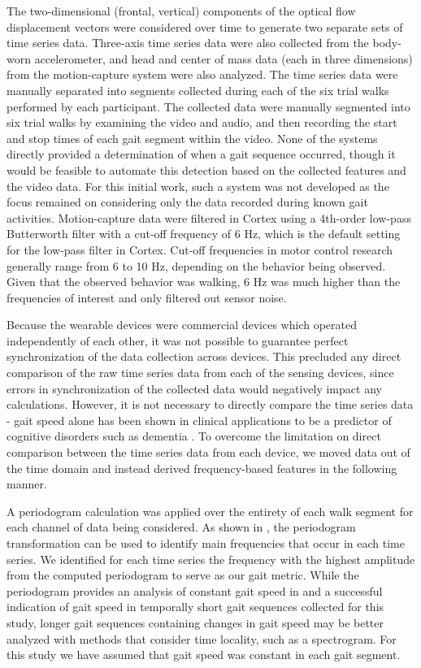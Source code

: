 \documentclass[12pt]{report}
\begin{document}
The two-dimensional (frontal, vertical) components of the optical flow displacement vectors were considered over time to generate two separate sets of time series data. Three-axis time series data were also collected from the body-worn accelerometer, and head and center of mass data (each in three dimensions) from the motion-capture system were also analyzed. The time series data were manually separated into segments collected during each of the six trial walks performed by each participant. The collected data were manually segmented into six trial walks by examining the video and audio, and then recording the start and stop times of each gait segment within the video. None of the systems directly provided a determination of when a gait sequence occurred, though it would be feasible to automate this detection based on the collected features and the video data. For this initial work, such a system was not developed as the focus remained on considering only the data recorded during known gait activities. Motion-capture data were filtered in Cortex using a 4th-order low-pass Butterworth filter with a cut-off frequency of 6 Hz, which is the default setting for the low-pass filter in Cortex. Cut-off frequencies in motor control research generally range from 6 to 10 Hz, depending on the behavior being observed. Given that the observed behavior was walking, 6 Hz was much higher than the frequencies of interest and only filtered out sensor noise.

Because the wearable devices were commercial devices which operated independently of each other, it was not possible to guarantee perfect synchronization of the data collection across devices. This precluded any direct comparison of the raw time series data from each of the sensing devices, since errors in synchronization of the collected data would negatively impact any calculations. However, it is not necessary to directly compare the time series data - gait speed alone has been shown in clinical applications to be a predictor of cognitive disorders such as dementia \cite{Bramell-Risberg2005LowerControls}. To overcome the limitation on direct comparison between the time series data from each device, we moved data out of the time domain and instead derived frequency-based features in the following manner. 

A periodogram calculation was applied over the entirety of each walk segment for each channel of data being considered. As shown in \cite{Schneider2017PreliminaryProcessing}, the periodogram transformation can be used to identify main frequencies that occur in each time series. We identified for each time series the frequency with the highest amplitude from the computed periodogram to serve as our gait metric. While the periodogram provides an analysis of constant gait speed in \cite{Schneider2017PreliminaryProcessing} and a successful indication of gait speed in temporally short gait sequences collected for this study, longer gait sequences containing changes in gait speed may be better analyzed with methods that consider time locality, such as a spectrogram. For this study we have assumed that gait speed was constant in each gait segment.
\end{document}
